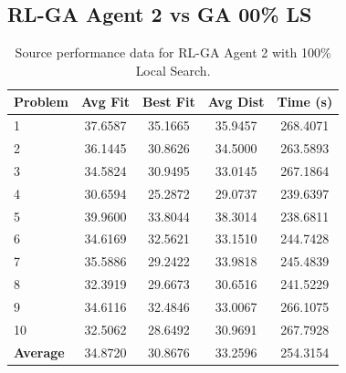 \subsection{RL-GA Agent 2 vs GA 00\% LS}
\begin{table}[H]
\centering
\small
\begin{tabular}{lcccc}
\toprule
\textbf{Problem} & \textbf{Avg Fit} & \textbf{Best Fit} & \textbf{Avg Dist} & \textbf{Time (s)} \\
\midrule
1  & 37.6587 & 35.1665 & 35.9457 & 268.4071 \\
2  & 36.1445 & 30.8626 & 34.5000 & 263.5893 \\
3  & 34.5824 & 30.9495 & 33.0145 & 267.1864 \\
4  & 30.6594 & 25.2872 & 29.0737 & 239.6397 \\
5  & 39.9600 & 33.8044 & 38.3014 & 238.6811 \\
6  & 34.6169 & 32.5621 & 33.1510 & 244.7428 \\
7  & 35.5886 & 29.2422 & 33.9818 & 245.4839 \\
8  & 32.3919 & 29.6673 & 30.6516 & 241.5229 \\
9  & 34.6116 & 32.4846 & 33.0067 & 266.1075 \\
10 & 32.5062 & 28.6492 & 30.9691 & 267.7928 \\
\midrule
\textbf{Average} & 34.8720 & 30.8676 & 33.2596 & 254.3154 \\
\bottomrule
\end{tabular}
\caption{Source performance data for RL-GA Agent 2 with 100\% Local Search.}
\label{tab:rl_100ls_source}
\end{table}



